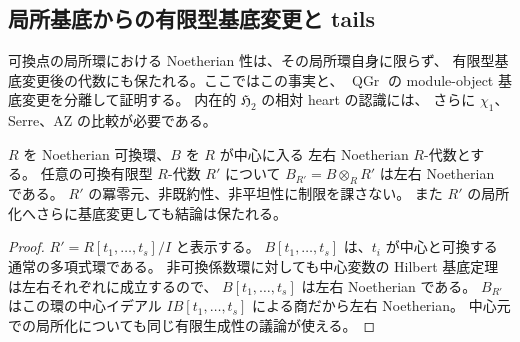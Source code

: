 \subsection{局所基底からの有限型基底変更と tails}

可換点の局所環における Noetherian 性は、その局所環自身に限らず、
有限型基底変更後の代数にも保たれる。ここではこの事実と、
$\operatorname{QGr}$ の module-object 基底変更を分離して証明する。
内在的 $\mathfrak H_2$ の相対 heart の認識には、
さらに $\chi_1$、Serre、AZ の比較が必要である。

\begin{lemma}
\label{lem:local-finite-type-strong-noetherian}
$R$ を Noetherian 可換環、$B$ を $R$ が中心に入る
左右 Noetherian $R$-代数とする。
任意の可換有限型 $R$-代数 $R'$ について
$B_{R'}=B\otimes_RR'$ は左右 Noetherian である。
$R'$ の冪零元、非既約性、非平坦性に制限を課さない。
また $R'$ の局所化へさらに基底変更しても結論は保たれる。
\end{lemma}
\begin{proof}
$R'=R[t_1,\ldots,t_s]/I$ と表示する。
$B[t_1,\ldots,t_s]$ は、$t_i$ が中心と可換する
通常の多項式環である。
非可換係数環に対しても中心変数の
Hilbert 基底定理は左右それぞれに成立するので、
$B[t_1,\ldots,t_s]$ は左右 Noetherian である。
$B_{R'}$ はこの環の中心イデアル $IB[t_1,\ldots,t_s]$
による商だから左右 Noetherian。
中心元での局所化についても同じ有限生成性の議論が使える。
\end{proof}

